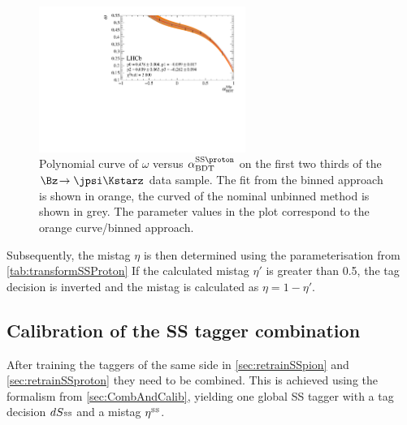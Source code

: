 \begin{figure}[tbp]
	\begin{center}
		\includegraphics[width=0.6\textwidth]{08FlavourTagging/figs/SSProtonBDTTrafo.pdf}
	\end{center}
	\caption{Polynomial curve of $\omega$ versus $\alpha^{\text{SS}\proton}_\text{BDT}$ on the first two thirds of the $\Bz\!\to\jpsi\Kstarz$ data sample.
	The fit from the binned approach is shown in orange, the curved of the nominal unbinned method is shown in grey.
	The parameter values in the plot correspond to the orange curve/binned approach.}
	\label{fig:transformationSSProton}
\end{figure}

Subsequently, the mistag $\eta$ is then determined using the parameterisation from \cref{tab:transformSSProton}
If the calculated mistag $\eta'$ is greater than \num{0.5}, the tag decision is inverted and the mistag is calculated as $\eta=1-\eta'$.

\subsection{Calibration of the SS tagger combination}
\label{sec:SScombinationcalibration}

After training the taggers of the same side in \cref{sec:retrainSSpion} and \cref{sec:retrainSSproton} they need to be combined.
This is achieved using the formalism from \cref{sec:CombAndCalib}, yielding one global SS tagger with a tag decision $dS{\text{\tiny SS}}$ and a mistag $\eta^{\text{\tiny SS}}$.


